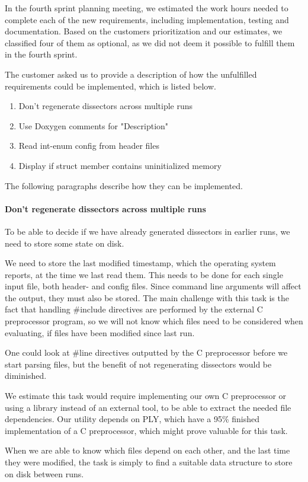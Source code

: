 In the fourth sprint planning meeting, we estimated the work hours needed to
complete each of the new requirements, including implementation, testing and
documentation. Based on the customers prioritization and our estimates, we
classified four of them as optional, as we did not deem it possible to
fulfill them in the fourth sprint.

The customer asked us to provide a description of how the unfulfilled
requirements could be implemented, which is listed below.
\begin{enumerate}
\item Don't regenerate dissectors across multiple runs
\item Use Doxygen comments for "Description"	
\item Read int-enum config from header files
\item Display if struct member contains uninitialized memory
\end{enumerate}

\noindent The following paragraphs describe how they can be implemented.
\paragraph{Don't regenerate dissectors across multiple runs}
To be able to decide if we have already generated dissectors in earlier runs, we need to store some state on disk. 

We need to store the last modified timestamp, which the operating system reports, at the time we last read them. 
This needs to be done for each single input file, both header- and config files.
Since command line arguments will affect the output, they must also be stored. The main challenge with this task is the fact that handling \#include directives are performed by the external C preprocessor program, so we will not know which files need to be considered when evaluating, if files have been modified since last run.

One could look at \#line directives outputted by the C preprocessor before we start parsing files, but the benefit of not regenerating dissectors would be diminished.

We estimate this task would require implementing our own C preprocessor or using a library instead of an external tool, to be able to extract the needed file dependencies. Our utility depends on PLY, which have a 95\% finished implementation of a C preprocessor, which might prove valuable for this task.

When we are able to know which files depend on each other, and the last time they were modified, the task is simply to find a suitable data structure to store on disk between runs.

